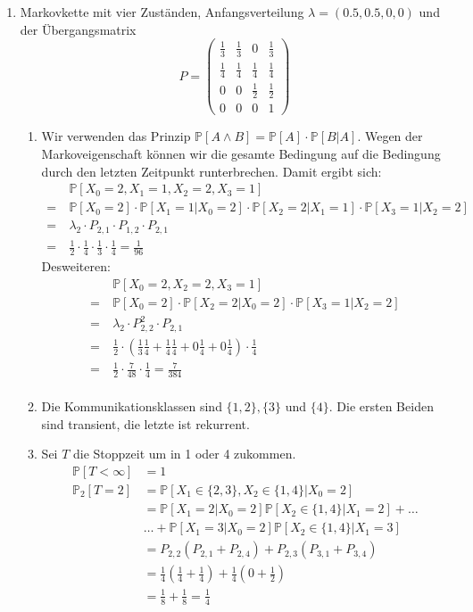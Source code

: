 \documentclass[a4paper,11pt,notitlepage,fullpage]{article}
\newcommand{\pp}[1]{\mathbb P\left[#1\right]}
\newcommand{\ppp}[2]{\mathbb P_#1\left[#2\right]}
\begin{document}
\begin{enumerate}
\newpage
\item Markovkette mit vier Zuständen, Anfangsverteilung $\lambda = (0.5, 0.5, 0, 0)$ und der Übergangsmatrix
$$P=\begin{pmatrix}
\frac{1}{3} & \frac{1}{3} & 0 & \frac{1}{3} \\
\frac{1}{4} & \frac{1}{4} & \frac{1}{4} & \frac{1}{4} \\
0 & 0 & \frac{1}{2} & \frac{1}{2} \\
0 & 0 & 0 & 1
\end{pmatrix}$$
\begin{enumerate}
\item Wir verwenden das Prinzip $\pp{A \wedge B} = \pp{A} \cdot \pp{B|A}$. Wegen der Markoveigenschaft können wir die gesamte Bedingung auf die Bedingung durch den letzten Zeitpunkt runterbrechen. Damit ergibt sich:
\begin{align*}
&\pp{X_0 = 2, X_1 = 1, X_2 = 2, X_3 = 1} \\
=~&\pp{X_0 = 2} \cdot \pp{X_1 = 1 | X_0 = 2} \cdot \pp{X_2 = 2 | X_1 = 1} \cdot \pp{X_3 = 1 | X_2 = 2} \\
=~&\lambda_2 \cdot P_{2, 1} \cdot P_{1, 2} \cdot P_{2, 1} \\
=~&\frac{1}{2} \cdot \frac{1}{4} \cdot \frac{1}{3} \cdot \frac{1}{4} = \frac{1}{96}
\end{align*}
Desweiteren:
\begin{align*}
&\pp{X_0 = 2, X_2 = 2, X_3 = 1} \\
=~&\pp{X_0 = 2} \cdot \pp{X_2 = 2 | X_0 = 2} \cdot \pp{X_3 = 1 | X_2 = 2} \\
=~&\lambda_2 \cdot P^2_{2, 2} \cdot P_{2, 1} \\
=~&\frac{1}{2} \cdot (\frac{1}{3}\frac{1}{4} + \frac{1}{4}\frac{1}{4} + 0 \frac{1}{4}+ 0 \frac{1}{4}) \cdot \frac{1}{4} \\
=~&\frac{1}{2} \cdot \frac{7}{48} \cdot \frac{1}{4}  = \frac{7}{384}\\
\end{align*}

\item Die Kommunikationsklassen sind $\{1, 2\}, \{3\}$ und $\{4\}$. Die ersten Beiden sind transient, die letzte ist rekurrent.

\item Sei $T$ die Stoppzeit um in 1 oder 4 zukommen.
\begin{align*}
\pp{T < \infty} &= 1 \\
\ppp{2}{T = 2} &= \pp{X_1 \in \{2,3\}, X_2 \in \{1,4\} | X_0 = 2} \\
&= \pp{X_1 = 2 | X_0 = 2} \pp{ X_2 \in \{1,4\} | X_1 = 2} + \hdots \\
&\hdots + \pp{X_1 = 3 | X_0 = 2} \pp{ X_2 \in \{1,4\} | X_1 = 3} \\
&= P_{2,2}(P_{2,1}+P_{2,4}) + P_{2,3}(P_{3,1}+P_{3,4}) \\
&= \frac{1}{4} \left(\frac{1}{4} + \frac{1}{4}\right) + \frac{1}{4}\left(0 + \frac{1}{2}\right) \\
&= \frac{1}{8} + \frac{1}{8} = \frac{1}{4}
\end{align*}


\end{enumerate}
\end{enumerate}
\end{document}
